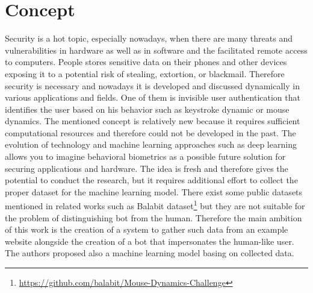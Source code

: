 \section{Concept}\label{sec:concept}
Security is a hot topic, especially nowadays, when there are many threats and vulnerabilities in hardware as well as in software and the facilitated remote access to computers.
People stores sensitive data on their phones and other devices exposing it to a potential risk of stealing, extortion, or blackmail.
Therefore security is necessary and nowadays it is developed and discussed dynamically in various applications and fields.
One of them is invisible user authentication that identifies the user based on his behavior such as keystroke dynamic or mouse dynamics.
The mentioned concept is relatively new because it requires sufficient computational resources and therefore could not be developed in the past.
The evolution of technology and machine learning approaches such as deep learning allows you to imagine behavioral biometrics as a possible future solution for securing applications and hardware.
The idea is fresh and therefore gives the potential to conduct the research, but it requires additional effort to collect the proper dataset for the machine learning model.
There exist some public datasets mentioned in related works such as Balabit dataset\footnote{\url{https://github.com/balabit/Mouse-Dynamics-Challenge}} but they are not suitable for the problem of distinguishing bot from the human.
Therefore the main ambition of this work is the creation of a system to gather such data from an example website alongside the creation of a bot that impersonates the human-like user.
The authors proposed also a machine learning model basing on collected data.
